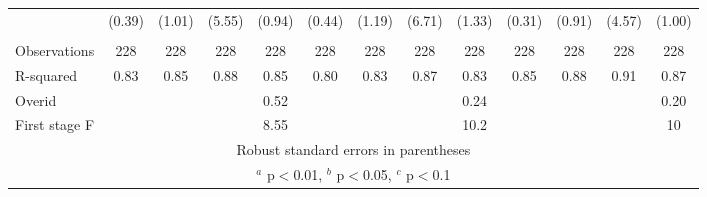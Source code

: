 \documentclass[]{article}
\begin{document}
\begin{tabular}{lcccccccccccc}
 & (0.39) & (1.01) & (5.55) & (0.94) & (0.44) & (1.19) & (6.71) & (1.33) & (0.31) & (0.91) & (4.57) & (1.00) \\
 &  &  &  &  &  &  &  &  &  &  &  &  \\
Observations & 228 & 228 & 228 & 228 & 228 & 228 & 228 & 228 & 228 & 228 & 228 & 228 \\
R-squared & 0.83 & 0.85 & 0.88 & 0.85 & 0.80 & 0.83 & 0.87 & 0.83 & 0.85 & 0.88 & 0.91 & 0.87 \\
Overid &  &  &  & 0.52 &  &  &  & 0.24 &  &  &  & 0.20 \\
 First stage F &  &  &  & 8.55 &  &  &  & 10.2 &  &  &  & 10 \\ \hline
\multicolumn{13}{c}{ Robust standard errors in parentheses} \\
\multicolumn{13}{c}{ $^a$ p$<$0.01, $^b$ p$<$0.05, $^c$ p$<$0.1} \\
\end{tabular}
\end{document}
